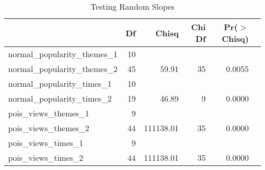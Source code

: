 \begin{table}[ht]
	   \caption{Testing Random Slopes} 
	\label{anova}
\centering
\begin{tabular}{lrrrrr}
  \hline
 & Df & Chisq & Chi Df & Pr($>$Chisq) \\ 
  \hline
normal\_popularity\_themes\_1 & 10 &  &  &  \\ 
  normal\_popularity\_themes\_2 & 45 & 59.91 & 35 & 0.0055 \\ 
normal\_popularity\_times\_1 & 10 &  &  &  \\ 
  normal\_popularity\_times\_2 & 19 & 46.89 & 9 & 0.0000 \\ 
pois\_views\_themes\_1 & 9 &  &  &  \\ 
  pois\_views\_themes\_2 & 44 & 111138.01 & 35 & 0.0000 \\ 
pois\_views\_times\_1 & 9 &  &  &  \\ 
  pois\_views\_times\_2 & 44 & 111138.01 & 35 & 0.0000 \\ 
   \hline

\end{tabular}
\end{table}
